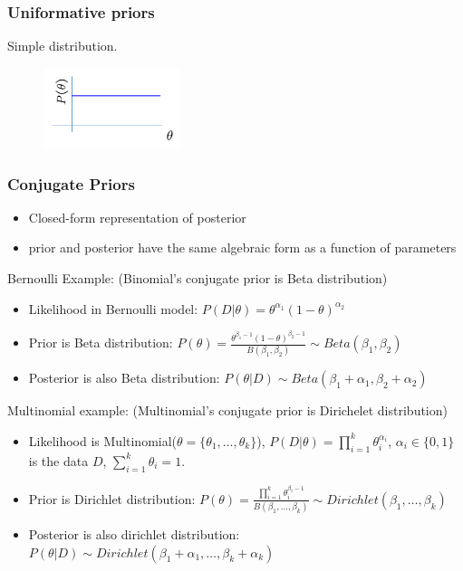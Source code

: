 \documentclass[letterpaper,10pt]{article}
\begin{document}
\subsubsection{Uniformative priors}

Simple distribution. 
\begin{figure}[!h]
	\centering
	\includegraphics[width=4cm]{./img/uniform.png}
\end{figure}

\subsubsection{Conjugate Priors}

\begin{itemize}
	\item Closed-form representation of posterior
	\item prior and posterior have the same algebraic form as a function of parameters
\end{itemize}

Bernoulli Example: (Binomial's conjugate prior is Beta distribution)
\begin{itemize}
	\item Likelihood in Bernoulli model: $P(D|\theta)=\theta^{\alpha_1}(1-\theta)^{\alpha_2}$
	\item Prior is Beta distribution: $P(\theta)=\frac{\theta^{\beta_1-1}(1-\theta)^{\beta_2-1}}{B(\beta_1,\beta_2)} \sim Beta(\beta_1,\beta_2)$
	\item Posterior is also Beta distribution: $P(\theta|D)\sim Beta(\beta_1+\alpha_1,\beta_2+\alpha_2)$
\end{itemize}

Multinomial example: (Multinomial's conjugate prior is Dirichelet distribution)
\begin{itemize}
	\item Likelihood is Multinomial($\theta=\{\theta_1,\dots,\theta_k\}$), $P(D|\theta)=\prod_{i=1}^{k}\theta_i^{\alpha_i}$, $\alpha_i\in\{0,1\}$ is the data $D$, $\sum_{i=1}^{k}\theta_i =1$.
	\item Prior is Dirichlet distribution: $P(\theta)=\frac{\prod_{i=1}^{k}\theta_i^{\beta_i-1}}{B(\beta_1,\dots,\beta_k)} \sim Dirichlet(\beta_1,\dots,\beta_k)$
	\item Posterior is also dirichlet distribution: $P(\theta|D) \sim Dirichlet(\beta_1+\alpha_1,\dots,\beta_k+\alpha_k)$
\end{itemize}
\end{document}
